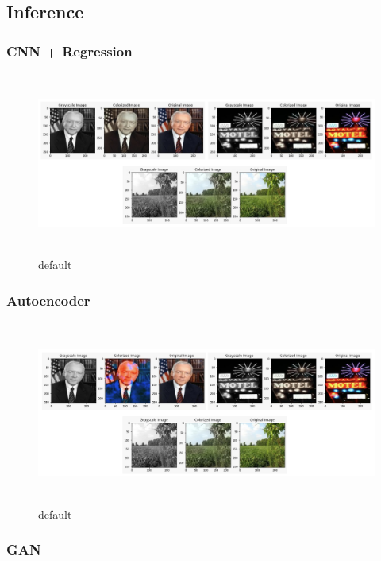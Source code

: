 \documentclass{article}
\begin{document}
\subsection{Inference}

\subsubsection{CNN + Regression}

\begin{figure}[htp]

    \centering
    \includegraphics[width=15cm, height=6cm]{regression-inference.png}\hfill
    \caption{default}
    
\end{figure}
\pagebreak
\subsubsection{Autoencoder}

\begin{figure}[htp]

    \centering
    \includegraphics[width=15cm, height=6cm]{autoencoder-inference.png}\hfill
    \caption{default}
    
\end{figure}

\subsubsection{GAN}
\end{document}
